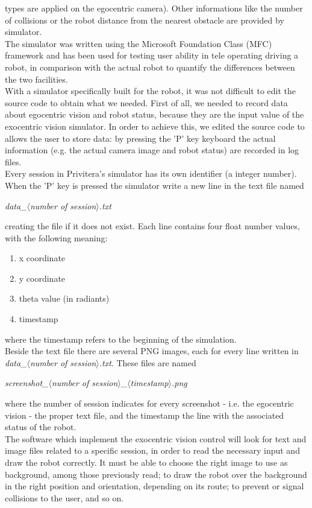 types are applied on the egocentric camera). Other informations 
like the number of collisions or the robot distance from the 
nearest obstacle are provided by simulator.
\\
The simulator was written using the Microsoft Foundation Class
(MFC) framework and has been used for testing user ability in
tele operating driving a robot, in comparison with the actual 
robot to quantify the differences between the two facilities. 
\\
With a simulator specifically built for the \morduc{} robot, it 
was not difficult to edit the source code to obtain what we 
needed. First of all, we needed to record data about egocentric 
vision and robot status, because they are the input value 
of the exocentric vision simulator. In order to achieve this, 
we edited the source code to allows the user to store data: by 
pressing the 'P' key keyboard the actual information (e.g. the 
actual camera image and robot status) are recorded in log files.
\\
Every session in Privitera's simulator has its own identifier 
(a integer number). When the 'P' key is pressed the simulator 
write a new line in the text file named

\begin{center}
  \textit{data\_$\langle$number of session$\rangle$.txt}
\end{center}

creating the file if it does not 
exist. Each line contains four float number values, with the 
following meaning:

\begin{enumerate}
\item x coordinate
\item y coordinate
\item theta value (in radiants)
\item timestamp
\end{enumerate}

where the timestamp refers to the beginning of the simulation.
\\
Beside the text file there are several PNG images, each for every 
line written in \textit{data\_$\langle$number of 
session$\rangle$.txt}.
These files are named

\begin{center}
  \textit{screenshot\_$\langle$number of 
    session$\rangle$\_$\langle$timestamp$\rangle$.png}
\end{center}

where the 
number of session indicates for every screenshot 
- i.e. the egocentric vision - the proper text file, and the 
timestamp the line with the associated status of the robot.
\\
The software which implement the exocentric vision control 
will look for text and image files related to a specific 
session, in order to read the necessary input and draw the 
robot correctly. It must be able to choose the right image 
to use as background, among those previously read; to draw 
the robot over the background in the right position and 
orientation, depending on its route; to prevent or signal 
collisions to the user, and so on.
